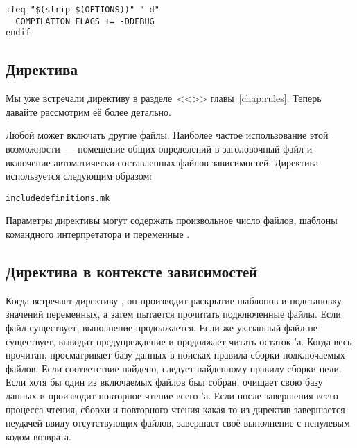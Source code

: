 {\footnotesize
\begin{verbatim}
ifeq "$(strip $(OPTIONS))" "-d"
  COMPILATION_FLAGS += -DDEBUG
endif
\end{verbatim}
}

\subsection{Директива }
\label{sec:include_directive}
Мы уже встречали директиву  в
разделе~<<>> главы~\ref{chap:rules}. Теперь
давайте рассмотрим её более детально.

Любой \Makefile{} может включать другие файлы. Наиболее частое
использование этой возможности~--- помещение общих определений
\GNUmake{} в заголовочный файл и включение автоматически составленных
файлов зависимостей. Директива  используется
следующим образом:

\begin{alltt}
\footnotesize
include definitions.mk
\end{alltt}

Параметры директивы могут содержать произвольное число файлов, шаблоны
командного интерпретатора и переменные \GNUmake{}.

\subsection{Директива  в контексте зависимостей}
Когда \GNUmake{} встречает директиву , он
производит раскрытие шаблонов и подстановку значений переменных, а
затем пытается прочитать подключенные файлы. Если файл существует,
выполнение продолжается. Если же указанный файл не существует,
\GNUmake{} выводит предупреждение и продолжает читать остаток
\Makefile{}'а. Когда весь \Makefile{} прочитан, \GNUmake{}
просматривает базу данных в поисках правила сборки подключаемых
файлов. Если соответствие найдено, \GNUmake{} следует найденному
правилу сборки цели. Если хотя бы один из включаемых файлов был
собран, \GNUmake{} очищает свою базу данных и производит повторное
чтение всего \Makefile{}'а. Если после завершения всего процесса
чтения, сборки и повторного чтения какая-то из директив
 завершается неудачей ввиду отсутствующих файлов,
\GNUmake{} завершает своё выполнение с ненулевым кодом возврата.

